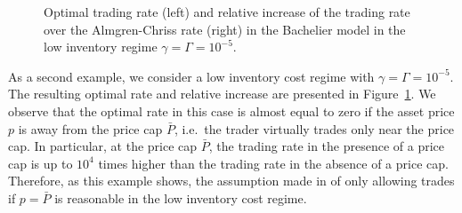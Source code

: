 \documentclass[11pt]{article}
\numberwithin{equation}{section}
\newlength\figheight
\newlength\figwidth
\theoremstyle{definition}
\theoremstyle{remark}
\begin{document}
\begin{figure}[ht]
 \setlength{}
 \setlength{}
 \centering
 \hspace{0.5em}
 
 \caption{Optimal trading rate (left) and relative increase of the trading rate over the Almgren-Chriss rate (right) in the Bachelier model in the low inventory regime $\gamma = \Gamma = 10^{-5}$.}
 \label{fig:Bachelier:low}
\end{figure}

As a second example, we consider a low inventory cost regime with $\gamma = \Gamma = 10^{-5}$. The resulting optimal rate and relative increase are presented in Figure~\ref{fig:Bachelier:low}. We observe that the optimal rate in this case is almost equal to zero if the asset price $p$ is away from the price cap $\bar P$, i.e.\ the trader virtually trades only near the price cap. In particular, at the price cap $\bar P$, the trading rate in the presence of a price cap is up to $10^4$ times higher than the trading rate in the absence of a price cap. Therefore, as this example shows, the assumption made in \cite{neuman.schied.16} of only allowing trades if $p = \bar P$ is reasonable in the low inventory cost regime.









\end{document}
